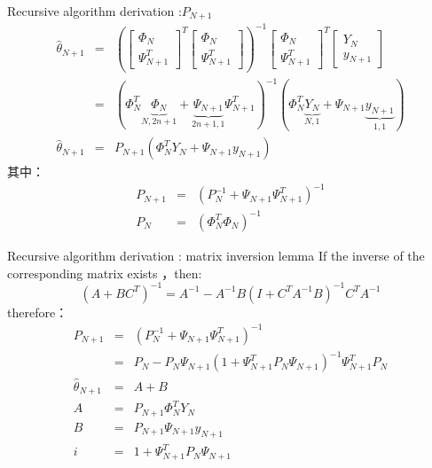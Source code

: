 \bgroup
{}
\begin{frame}{ Recursive algorithm derivation :$P_{N+1}$}
\begin{eqnarray*}
\hat\theta_{N+1} &=&
\left(
\begin{bmatrix} \Phi_N \\ \Psi_{N+1}^T\end{bmatrix}^T
\begin{bmatrix} \Phi_N \\ \Psi_{N+1}^T\end{bmatrix}
\right)^{-1}
\begin{bmatrix} \Phi_N \\ \Psi_{N+1}^T\end{bmatrix}^T
\begin{bmatrix} Y_N \\ y_{N+1}\end{bmatrix} \\
&=& (\Phi_N^T\underbrace{\Phi_N}_{N,2n+1}+\underbrace{\Psi_{N+1}}_{2n+1,1}\Psi_{N+1}^T)^{-1}(\Phi_N^T \underbrace{Y_N}_{N,1} +\Psi_{N+1}\underbrace{y_{N+1}}_{1,1})  \\
\hat\theta_{N+1} &=& P_{N+1}(\Phi_N^T Y_N + \Psi_{N+1} y_{N+1}) 
\end{eqnarray*}
其中：
\begin{eqnarray*}
P_{N+1} &=&(P_N^{-1}+\Psi_{N+1}\Psi_{N+1}^T)^{-1} \\
P_{N} &=& (\Phi_N^T\Phi_N)^{-1}
\end{eqnarray*}
\end{frame}
\egroup

\begin{frame}{ Recursive algorithm derivation : matrix inversion lemma}
If the inverse of the corresponding matrix exists ，then:
$$
(A+BC^T)^{-1}=A^{-1}-A^{-1}B(I+C^T A^{-1} B)^{-1} C^T A^{-1}
$$
therefore：
\begin{eqnarray*}
P_{N+1} &=&(P_N^{-1}+\Psi_{N+1}\Psi_{N+1}^T)^{-1} \\
&=& P_N -P_N\Psi_{N+1}(1+\Psi_{N+1}^T P_N \Psi_{N+1})^{-1}\Psi_{N+1}^T P_N \\
\hat\theta_{N+1} &=& A+B \\
A&=&P_{N+1}\Phi_N^T Y_N \\
B&=&P_{N+1}\Psi_{N+1} y_{N+1} \\
i&=& 1+\Psi_{N+1}^T P_N \Psi_{N+1}
\end{eqnarray*}
\end{frame}

